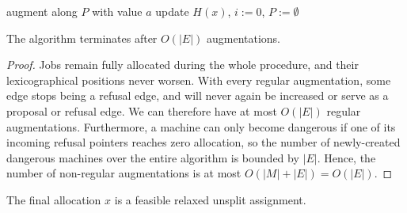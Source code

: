 \documentclass{llncs}
\begin{document}
\begin{algorithmic}
		\State augment along $P$ with value $a$
		\State update $H(x)$, $i := 0$, $P := \emptyset$
	\EndProcedure
\end{algorithmic}


\fi

\begin{claim}
\label{cl:rot_term}
The algorithm terminates after $O(|E|)$ augmentations.
\end{claim}

\begin{proof} 
Jobs remain fully allocated during the whole procedure, and their
lexicographical positions never worsen.  With every regular
augmentation, some edge stops being a refusal edge, and will never
again be increased or serve as a proposal or refusal edge.  We can
therefore have at most $O(|E|)$ regular augmentations.  Furthermore, a
machine can only become dangerous if one of its incoming refusal
pointers reaches zero allocation, so the number of newly-created
dangerous machines over the entire algorithm is bounded by $|E|$.
Hence, the number of non-regular augmentations is at most $O(|M| +
|E|) = O(|E|)$.
\end{proof}

\begin{claim}
The final allocation $x$ is a feasible relaxed unsplit assignment.
\end{claim}
	
\end{document}
